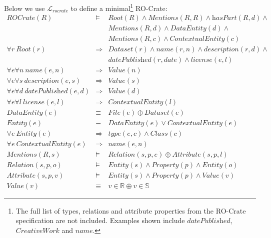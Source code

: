 \documentclass[ds,v1.1.2,openaccess]{iosart2x}%
\begin{document}
\begin{appendix}
Below we use $\mathcal{L}_{\mathit{rocrate}}$ to define a minimal\footnote{The full
list of types, relations and attribute properties from the
RO-Crate specification are not included. Examples shown include
$\textit{datePublished}$, $\textit{CreativeWork}$ and $\textit{name}$.
} RO-Crate:
%
\begin{eqnarray*}
\textit{ROCrate}(R) & \models& \textit{Root}(R) \land \textit{Mentions}(R, R)
\land \textit{hasPart}(R, d) \land
\\
& & {}\textit{Mentions}(R, d) \land \textit{DataEntity}(d) \land
\\
& & {}\textit{Mentions}(R, c) \land \textit{ContextualEntity}(c)
\\
\forall r \ \textit{Root}(r) & \Rightarrow& \textit{Dataset}(r) \land
\textit{name}(r, n) \land \textit{description}(r, d) \land
\\
& &{} \textit{datePublished}(r, date) \land \textit{license}(e, l)
\\
\forall e \forall n \ \textit{name}(e, n) & \Rightarrow& \textit{Value}(n)
\\
\forall e \forall s \ \textit{description}(e, s) & \Rightarrow&
\textit{Value}(s)
\\
\forall e \forall d \ \textit{datePublished}(e, d) & \Rightarrow&
\textit{Value}(d)
\\
\forall e \forall l \ \textit{license}(e, l) & \Rightarrow&
\textit{ContextualEntity}(l)
\\
\textit{DataEntity}(e) & \equiv& \textit{File}(e) \oplus \textit{Dataset}(e)
\\
\textit{Entity}(e) & \equiv& \textit{DataEntity}(e) \lor \textit{ContextualEntity}(e)
\\
\forall e \ \textit{Entity}(e) & \Rightarrow& \textit{type}(e, c) \land
\textit{Class}(c)
\\
\forall e \ \textit{ContextualEntity}(e) & \Rightarrow& \textit{name}(e, n)
\\
\textit{Mentions}(R, s) & \models& \textit{Relation}(s, p, e) \oplus
\textit{Attribute}(s, p, l)
\\
\textit{Relation}(s, p, o) & \models& \textit{Entity}(s) \land
\textit{Property}(p) \land \textit{Entity}(o)
\\
\textit{Attribute}(s, p, v) & \models& \textit{Entity}(s) \land
\textit{Property}(p) \land \textit{Value}(v)
\\
\textit{Value}(v) & \equiv& v \in\mathbb{R} \oplus v \in\mathbb{S}
\end{eqnarray*}


\end{appendix}
\end{document}
